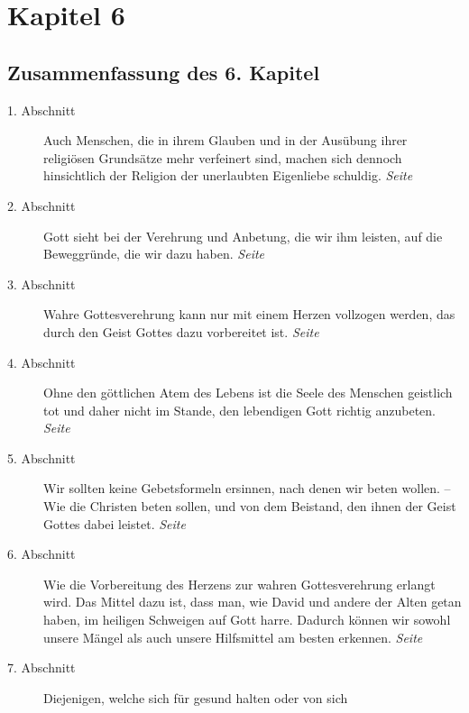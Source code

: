 

\chapter{Kapitel 6} \label{kap6}

\section{Zusammenfassung des 6. Kapitel}

\begin{description}
\item[1. Abschnitt] Auch Menschen, die in ihrem Glauben und in der Ausübung
ihrer religiösen Grundsätze mehr verfeinert sind, machen sich dennoch
hinsichtlich der Religion der unerlaubten Eigenliebe schuldig.
\dotfill \textit{Seite~\pageref{kap6_ab1}}\\
\item[2. Abschnitt] Gott sieht bei der Verehrung und Anbetung, die wir ihm
leisten, auf die Beweggründe, die wir dazu haben.
\dotfill \textit{Seite~\pageref{kap6_ab2}}\\
\item[3. Abschnitt] Wahre Gottesverehrung kann nur mit einem Herzen vollzogen
werden, das durch den Geist Gottes dazu vorbereitet ist.
\dotfill \textit{Seite~\pageref{kap6_ab3}}\\
\item[4. Abschnitt] Ohne den göttlichen Atem des Lebens ist die Seele des
Menschen geistlich tot und daher nicht im Stande, den lebendigen Gott richtig
anzubeten.
\dotfill \textit{Seite~\pageref{kap6_ab4}}\\
\item[5. Abschnitt] Wir sollten keine Gebetsformeln ersinnen, nach denen wir
beten wollen. -- Wie die Christen beten sollen, und von dem Beistand, den ihnen
der Geist Gottes dabei leistet.
\dotfill \textit{Seite~\pageref{kap6_ab5}}\\
\item[6. Abschnitt] Wie die Vorbereitung des Herzens zur wahren Gottesverehrung
erlangt wird. Das Mittel dazu ist, dass man, wie David und andere der Alten
getan haben, im heiligen Schweigen auf Gott harre. Dadurch können wir sowohl
unsere Mängel als auch unsere Hilfsmittel am besten erkennen.
\dotfill \textit{Seite~\pageref{kap6_ab6}}\\
\item[7. Abschnitt] Diejenigen, welche sich für gesund halten oder von sich

\end{description}
